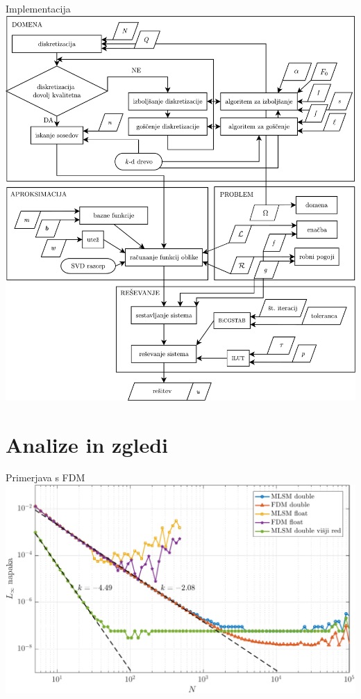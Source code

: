 \begin{frame}{Implementacija}
  \centering
  \includegraphics[height=0.9\textheight]{resources/diagram_finished.pdf}
\end{frame}

\section{Analize in zgledi}

\begin{frame}{Primerjava s FDM}
  \vspace{3ex}
  \includegraphics[width=\textwidth]{resources/lap1d_convergence.pdf}
\end{frame}

